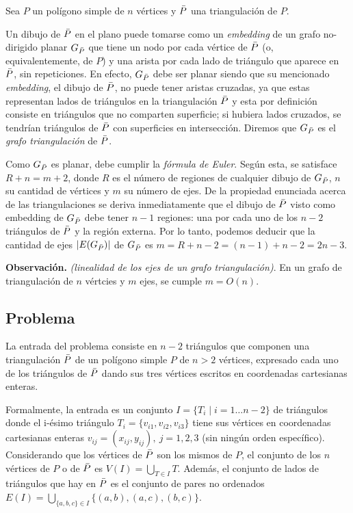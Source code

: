 Sea $P$ un polígono simple de $n$ vértices y $\bar{P}$ una triangulación de $P$.

\medskip

Un dibujo de $\bar{P}$ en el plano puede tomarse como un \textit{embedding} de un grafo no-dirigido planar $G_{\bar{P}}$ que tiene un nodo por cada vértice de $\bar{P}$ (o, equivalentemente, de $P$) y una arista por cada lado de triángulo que aparece en $\bar{P}$, sin repeticiones. En efecto, $G_{\bar{P}}$ debe ser planar siendo que su mencionado \textit{embedding}, el dibujo de $\bar{P}$, no puede tener aristas cruzadas, ya que estas representan lados de triángulos en la triangulación $\bar{P}$ y esta por definición consiste en triángulos que no comparten superficie; si hubiera lados cruzados, se tendrían triángulos de $\bar{P}$ con superficies en intersección. Diremos que $G_{\bar{P}}$ es el \textit{grafo triangulación} de $\bar{P}$.

\medskip

Como $G_{\bar{P}}$ es planar, debe cumplir la \textit{fórmula de Euler}. Según esta, se satisface $R + n = m + 2$, donde $R$ es el número de regiones de cualquier dibujo de $G_{\bar{P}}$, $n$ su cantidad de vértices y $m$ su número de ejes. De la propiedad enunciada acerca de las triangulaciones se deriva inmediatamente que el dibujo de $\bar{P}$ visto como embedding de $G_{\bar{P}}$ debe tener $n-1$ regiones: una por cada uno de los $n-2$ triángulos de $\bar{P}$ y la región externa. Por lo tanto, podemos deducir que la cantidad de ejes $|E(G_{\bar{P}})|$ de $G_{\bar{P}}$ es $m = R + n - 2 = (n-1) + n - 2 = 2n-3$.

\medskip

\textbf{Observación.} \textit{(linealidad de los ejes de un grafo triangulación)}. En un grafo de triangulación de $n$ vértcies y $m$ ejes, se cumple $m = O(n)$.

\subsection{Problema}

La entrada del problema consiste en $n-2$ triángulos que componen una triangulación $\bar{P}$ de un polígono simple $P$ de $n > 2$ vértices, expresado cada uno de los triángulos de $\bar{P}$ dando sus tres vértices escritos en coordenadas cartesianas enteras. 

Formalmente, la entrada es un conjunto $I = \{ T_i \mid i = 1 \dots n-2 \}$ de triángulos donde el i-ésimo triángulo $T_i = \{ v_{i1}, v_{i2}, v_{i3} \}$ tiene sus vértices en coordenadas cartesianas enteras $v_{ij} = (x_{ij}, y_{ij}), \ j = 1,2,3$ (sin ningún orden específico). Considerando que los vértices de $\bar{P}$ son los mismos de $P$, el conjunto de los $n$ vértices de $P$ o de $\bar{P}$ es $V(I) = \bigcup_{T \in I} T$. Además, el conjunto de lados de triángulos que hay en $\bar{P}$ es el conjunto de pares no ordenados $E(I) = \bigcup_{\{ a,b,c \} \in I} \{ (a,b), (a,c), (b,c) \}$.

